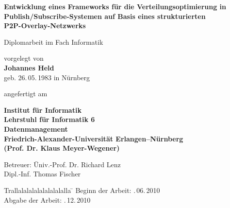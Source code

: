 \begin{titlepage}
  
  \begin{center}
    
    {\Huge \bf
Entwicklung eines Frameworks für die Verteilungsoptimierung in Publish/Subscribe-Systemen auf Basis eines strukturierten\\[0.4cm] P2P-Overlay-Netzwerks} 
    
    \vspace*{1cm}
    Diplomarbeit im Fach Informatik
    \vspace{2cm}
    
    {\large vorgelegt von} \\
    \vspace*{0.7cm}
    {\Large \bf Johannes Held} \\
    \vspace*{0.7cm}
    {\large geb. 26.\,05.\,1983 in Nürnberg} 
    
    \vspace{1cm}
    
    angefertigt am 

    \vspace{1cm}
    
    {\bf 
      Institut für Informatik \\
      Lehrstuhl für Informatik 6\\
      Datenmanagement \\
      Friedrich-Alexander-Universität Erlangen--Nürnberg \\
      (Prof. Dr. Klaus Meyer-Wegener)
      }
    
    \vspace{1cm}
\end{center}
\begin{tabbing}
    Betreuer: \= Univ.-Prof. Dr. Richard Lenz \\
    \> Dipl.-Inf. Thomas Fischer 
\end{tabbing}
    \vspace{1cm}
    
    
\begin{tabbing}
	Trallalalalalalalalalalla \= \kill
	Beginn der Arbeit:   .\,06.\,2010 \\
  Abgabe der Arbeit:   .\,12.\,2010
\end{tabbing}
    
  
\end{titlepage}

\clearpage{\pagestyle{empty}\cleardoublepage}
